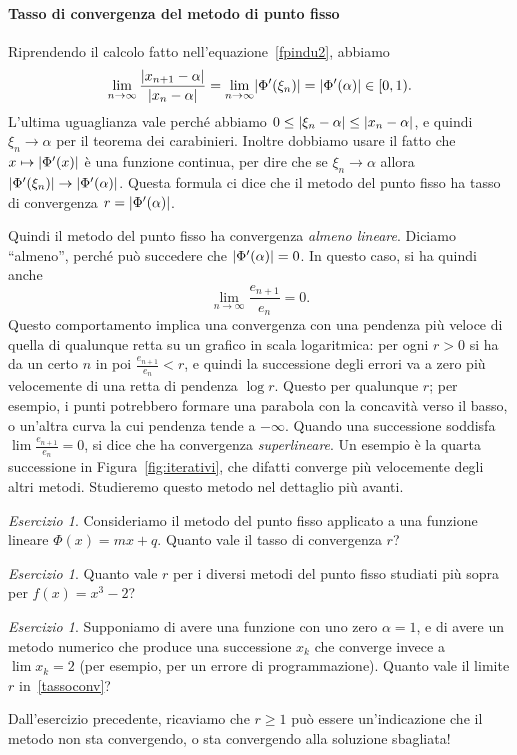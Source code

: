 \documentclass[a4paper]{report}
\DeclarePairedDelimiter{\abs}{\lvert}{\rvert}
\theoremstyle{definiton}
\theoremstyle{remark}
\newtheorem{esercizio}[theorem]{Esercizio}
\begin{document}
\paragraph{Tasso di convergenza del metodo di punto fisso} Riprendendo il calcolo fatto nell'equazione~\eqref{fpindu2}, abbiamo
\[
\lim_{n \to \infty} \frac{\abs{x_{n+1} - \alpha}}{\abs{x_n - \alpha}} = \lim_{n\to\infty} \abs{\Phi'(\xi_n)} = \abs{\Phi'(\alpha)} \in [0,1).
\]
L'ultima uguaglianza vale perché abbiamo $0 \leq \abs{\xi_n - \alpha} \leq \abs{x_n - \alpha}$, e quindi $\xi_n \to \alpha$ per il teorema dei carabinieri. Inoltre dobbiamo usare il fatto che $x \mapsto \abs{\Phi'(x)}$ è una funzione continua, per dire che se $\xi_n\to\alpha$ allora $\abs{\Phi'(\xi_n)} \to \abs{\Phi'(\alpha)}$. Questa formula ci dice che il metodo del punto fisso ha tasso di convergenza $r = \abs{\Phi'(\alpha)}$.

Quindi il metodo del punto fisso ha convergenza \emph{almeno lineare}. Diciamo ``almeno'', perché può succedere che $\abs{\Phi'(\alpha)} = 0$. In questo caso, si ha quindi anche
\[
    \lim_{n\to\infty} \frac{e_{n+1}}{e_n} = 0.
\]
Questo comportamento implica una convergenza con una pendenza più veloce di quella di qualunque retta su un grafico in scala logaritmica: per ogni $r>0$ si ha da un certo $n$ in poi $\frac{e_{n+1}}{e_n} < r$, e quindi la successione degli errori va a zero più velocemente di una retta di pendenza $\log r$. Questo per qualunque $r$; per esempio, i punti potrebbero formare una parabola con la concavità verso il basso, o un'altra curva la cui pendenza tende a $-\infty$. Quando una successione soddisfa $\lim \frac{e_{n+1}}{e_n} = 0$, si dice che ha convergenza \emph{superlineare}. Un esempio è la quarta successione in Figura~\ref{fig:iterativi}, che difatti converge più velocemente degli altri metodi. Studieremo questo metodo nel dettaglio più avanti.

\begin{esercizio}
    Consideriamo il metodo del punto fisso applicato a una funzione lineare $\Phi(x) = mx + q$. Quanto vale il tasso di convergenza $r$?
\end{esercizio}
\begin{esercizio}
    Quanto vale $r$ per i diversi metodi del punto fisso studiati più sopra per $f(x) = x^3 - 2$?
\end{esercizio}
\begin{esercizio}
    Supponiamo di avere una funzione con uno zero $\alpha = 1$, e di avere un metodo numerico che produce una successione $x_k$ che converge invece a $\lim x_k = 2$ (per esempio, per un errore di programmazione). Quanto vale il limite $r$ in~\eqref{tassoconv}?
\end{esercizio}
Dall'esercizio precedente, ricaviamo che $r \geq 1$ può essere un'indicazione che il metodo non sta convergendo, o sta convergendo alla soluzione sbagliata!
\end{document}
